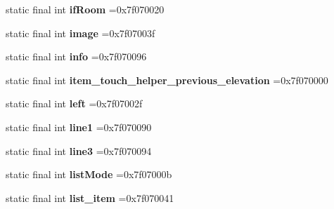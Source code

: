 \begin{DoxyCompactItemize}
\item 
\mbox{\label{classproject4_1_1xaria_1_1R_1_1id_aa9c1e7a36a0308f33850488e12d6f99c}} 
static final int {\bfseries if\+Room} =0x7f070020
\item 
\mbox{\label{classproject4_1_1xaria_1_1R_1_1id_a6c0ff88447e6e528b984eb718d54c5dc}} 
static final int {\bfseries image} =0x7f07003f
\item 
\mbox{\label{classproject4_1_1xaria_1_1R_1_1id_a6a676ab9dec4b8c7ba973ff3ecb443a8}} 
static final int {\bfseries info} =0x7f070096
\item 
\mbox{\label{classproject4_1_1xaria_1_1R_1_1id_a6efa48e81feee90b11fe7d6572e3dab9}} 
static final int {\bfseries item\+\_\+touch\+\_\+helper\+\_\+previous\+\_\+elevation} =0x7f070000
\item 
\mbox{\label{classproject4_1_1xaria_1_1R_1_1id_a01dfc951cc703d4e4f31044b2a05c6ea}} 
static final int {\bfseries left} =0x7f07002f
\item 
\mbox{\label{classproject4_1_1xaria_1_1R_1_1id_a4ec9b2f08d8254c4665b8089a86d0094}} 
static final int {\bfseries line1} =0x7f070090
\item 
\mbox{\label{classproject4_1_1xaria_1_1R_1_1id_a6a31564532e7a15f291791ce2deb1082}} 
static final int {\bfseries line3} =0x7f070094
\item 
\mbox{\label{classproject4_1_1xaria_1_1R_1_1id_a2e23725d427f3e8f4029ccbe47c90a62}} 
static final int {\bfseries list\+Mode} =0x7f07000b
\item 
\mbox{\label{classproject4_1_1xaria_1_1R_1_1id_a6c0bb40d75cf0574d46b36ae15eae77b}} 
static final int {\bfseries list\+\_\+item} =0x7f070041
\item 
\mbox{\label{classproject4_1_1xaria_1_1R_1_1id_a9687fb152bad66735551dbce0576ca0a}} 

\end{DoxyCompactItemize}
